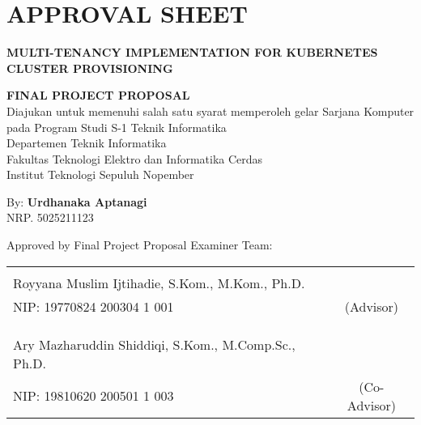 \chapter*{APPROVAL SHEET}
\thispagestyle{empty}

\begin{center}
  \textbf{MULTI-TENANCY IMPLEMENTATION FOR KUBERNETES CLUSTER PROVISIONING}
\end{center}

\begingroup
\small

\begin{center}
  \textbf{FINAL PROJECT PROPOSAL} \\
  Diajukan untuk memenuhi salah satu syarat memperoleh gelar
  Sarjana Komputer pada
  Program Studi S-1 Teknik Informatika \\
  Departemen Teknik Informatika \\
  Fakultas Teknologi Elektro dan Informatika Cerdas \\
  Institut Teknologi Sepuluh Nopember
\end{center}

\begin{center}
  By: \textbf{Urdhanaka Aptanagi} \\
  NRP. 5025211123
\end{center}

\begin{center}
  Approved by Final Project Proposal Examiner Team:
\end{center}

\vspace{10ex}

\begingroup
\setlength{\tabcolsep}{0pt}

\noindent
\begin{tabularx}{\textwidth}{X c}
        &                 \\
  Royyana Muslim Ijtihadie, S.Kom., M.Kom., Ph.D.     &                 \\
  NIP: 19770824 200304 1 001                          & (Advisor)    \\
                                                      &                 \\
                                                      &                 \\
                                                      &                 \\
  Ary Mazharuddin Shiddiqi, S.Kom., M.Comp.Sc., Ph.D. &                 \\
  NIP: 19810620 200501 1 003                          & (Co-Advisor) \\
\end{tabularx}
\endgroup


